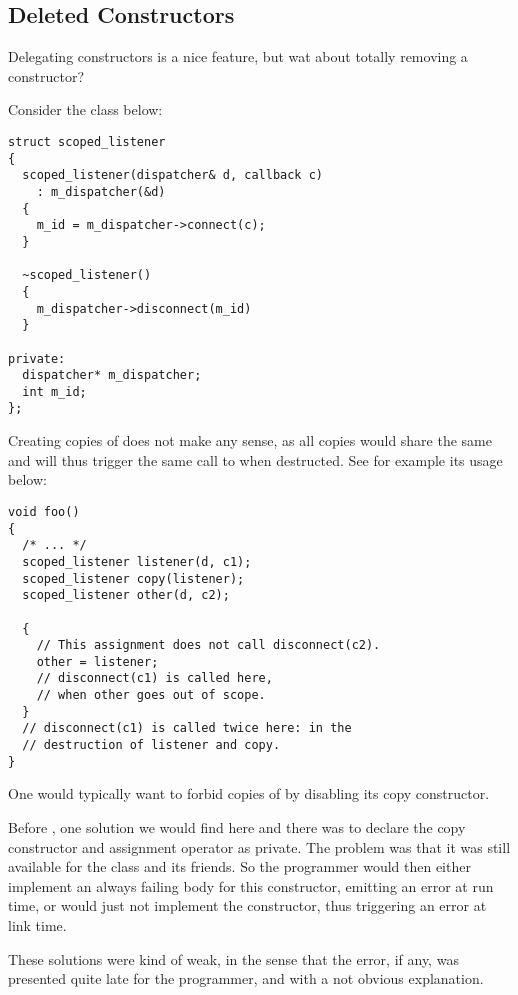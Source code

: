 \subsection{Deleted Constructors}

\problemtitle

Delegating constructors is a nice feature, but wat about totally
removing a constructor?

Consider the class below:

\begin{lstlisting}
struct scoped_listener
{
  scoped_listener(dispatcher& d, callback c)
    : m_dispatcher(&d)
  {
    m_id = m_dispatcher->connect(c);
  }

  ~scoped_listener()
  {
    m_dispatcher->disconnect(m_id)
  }

private:
  dispatcher* m_dispatcher;
  int m_id;
};
\end{lstlisting}

Creating copies of  does not make any sense, as
all copies would share the same  and will thus trigger the
same call to  when destructed. See for example
its usage below:

\begin{lstlisting}
void foo()
{
  /* ... */
  scoped_listener listener(d, c1);
  scoped_listener copy(listener);
  scoped_listener other(d, c2);

  {
    // This assignment does not call disconnect(c2).
    other = listener;
    // disconnect(c1) is called here,
    // when other goes out of scope.
  }
  // disconnect(c1) is called twice here: in the
  // destruction of listener and copy.
}
\end{lstlisting}

One would typically want to forbid copies of  by
disabling its copy constructor.

Before , one solution we would find here and there was to
declare the copy constructor and assignment operator as private. The
problem was that it was still available for the class and its
friends. So the programmer would then either implement an always
failing body for this constructor, emitting an error at run time, or
would just not implement the constructor, thus triggering an error at
link time.

These solutions were kind of weak, in the sense that the error, if
any, was presented quite late for the programmer, and with a not
obvious explanation.

